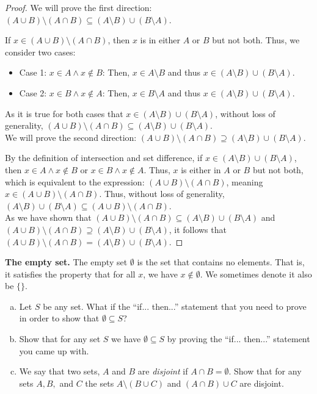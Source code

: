 \documentclass[11pt]{scrartcl}
\theoremstyle{dotlessP}
\theoremstyle{dotlessN}
\newcommand{\unite}{\cup}
\newcommand{\inter}{\cap}
\newcommand{\smin}{\setminus}
\begin{document}
\begin{enumerate}[a)]
\begin{proof}
		We will prove the first direction: $(A \unite B) \smin (A \inter B) \subseteq (A \smin B) \unite (B \smin A)$. 

		If $x \in (A \unite B) \smin (A \inter B)$, then $x$ is in either $A$ or $B$ but not both. Thus, we consider two cases:
		\begin{itemize}
			\item Case 1: $x \in A \land x \not\in B$: Then, $x \in A \smin B$ and thus $x \in (A \smin B) \unite (B \smin A)$.
			\item Case 2: $x \in B \land x \not\in A$: Then,  $x \in B \smin A$ and thus  $x \in (A \smin B) \unite (B \smin A)$.
		\end{itemize}
	As it is true for both cases that $x \in (A \smin B) \unite (B \smin A)$, without loss of generality,  $(A \unite B) \smin (A \inter B) \subseteq (A \smin B) \unite (B \smin A)$. 
	\\

	We will prove the second direction: $(A \unite B) \smin (A \inter B) \supseteq (A \smin B) \unite (B \smin A)$.

	By the definition of intersection and set difference, if  $x \in (A \smin B) \unite (B \smin A)$, then $x \in A \land x \not\in B$ or $x \in B \land x \not\in A$. Thus, $x$ is either in $A$ or $B$ but not both, which is equivalent to the expression: $(A \unite B) \smin (A \inter B)$, meaning $x \in (A \unite B) \smin (A \inter B)$. Thus, without loss of generality, $(A \smin B) \unite (B \smin A) \subseteq (A \unite B) \smin (A \inter B)$.
	\\

	As we have shown that $(A \unite B) \smin (A \inter B) \subseteq (A \smin B) \unite (B \smin A)$ and $(A \unite B) \smin (A \inter B) \supseteq (A \smin B) \unite (B \smin A)$, it follows that $(A \unite B) \smin (A \inter B) = (A \smin B) \unite (B \smin A)$.
	\end{proof}
\end{enumerate}
\begin{ques}
	\textbf{The empty set.} The empty set $\emptyset$ is the set that contains no elements. That is, it satisfies the property that for all  $x$, we have $x \not\in \emptyset$. We sometimes denote it also be $\{\}$. 
	\begin{enumerate}[(a)]
		\item Let $S$ be any set. What if the ``if... then...'' statement that you need to prove in order to show that $\emptyset \subseteq S$?
		\item Show that for any set $S$ we have  $\emptyset \subseteq S$ by proving the ``if... then...'' statement you came up with.
		\item We say that two sets, $A$ and $B$ are \textit{disjoint} if $A \inter B = \emptyset$. Show that for any sets $A,B,$ and $C$ the sets $A \smin (B \unite C)$ and $(A \inter B) \unite C$ are disjoint.
	\end{enumerate}
\end{ques}
\end{document}
